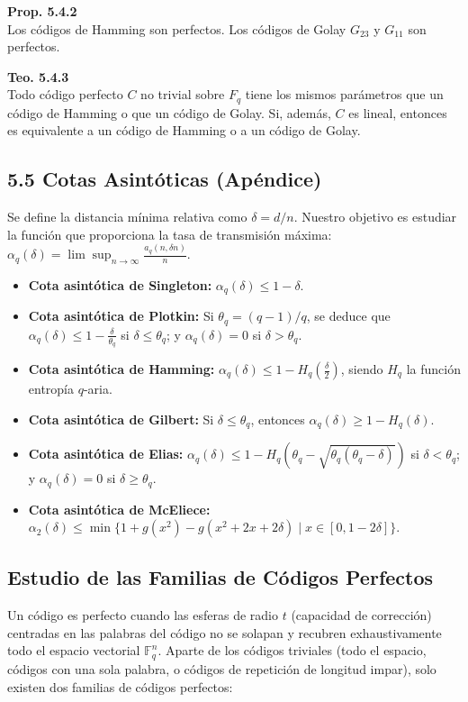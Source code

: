 \documentclass{article}
\begin{document}
\textbf{Prop. 5.4.2}\\
Los códigos de Hamming son perfectos. Los códigos de Golay $G_{23}$ y $G_{11}$ son perfectos.

\textbf{Teo. 5.4.3}\\
Todo código perfecto $C$ no trivial sobre $F_{q}$ tiene los mismos parámetros que un código de Hamming o que un código de Golay. Si, además, $C$ es lineal, entonces es equivalente a un código de Hamming o a un código de Golay.

\subsection{5.5 Cotas Asintóticas (Apéndice)}

Se define la distancia mínima relativa como $\delta = d/n$. Nuestro objetivo es estudiar la función que proporciona la tasa de transmisión máxima: $\alpha_{q}(\delta) = \lim \sup_{n\to\infty} \frac{a_{q}(n,\delta n)}{n}$.

\begin{itemize}
\item \textbf{Cota asintótica de Singleton:} $\alpha_{q}(\delta) \le 1-\delta$.
\item \textbf{Cota asintótica de Plotkin:} Si $\theta_{q} = (q-1)/q$, se deduce que $\alpha_{q}(\delta) \le 1-\frac{\delta}{\theta_{q}}$ si $\delta \le \theta_{q}$; y $\alpha_{q}(\delta) = 0$ si $\delta > \theta_{q}$.
\item \textbf{Cota asintótica de Hamming:} $\alpha_{q}(\delta) \le 1-H_{q}(\frac{\delta}{2})$, siendo $H_{q}$ la función entropía $q$-aria.
\item \textbf{Cota asintótica de Gilbert:} Si $\delta \le \theta_{q}$, entonces $\alpha_{q}(\delta) \ge 1-H_{q}(\delta)$.
\item \textbf{Cota asintótica de Elias:} $\alpha_{q}(\delta) \le 1-H_{q}(\theta_{q}-\sqrt{\theta_{q}(\theta_{q}-\delta)})$ si $\delta < \theta_{q}$; y $\alpha_{q}(\delta) = 0$ si $\delta \ge \theta_{q}$.
\item \textbf{Cota asintótica de McEliece:} $\alpha_{2}(\delta) \le \min\{1+g(x^{2})-g(x^{2}+2x+2\delta) \mid x \in [0,1-2\delta]\}$.
\end{itemize}

\subsection{Estudio de las Familias de Códigos Perfectos}

Un código es perfecto cuando las esferas de radio $t$ (capacidad de corrección) centradas en las palabras del código no se solapan y recubren exhaustivamente todo el espacio vectorial $\mathbb{F}_q^n$. Aparte de los códigos triviales (todo el espacio, códigos con una sola palabra, o códigos de repetición de longitud impar), solo existen dos familias de códigos perfectos:
\end{document}
